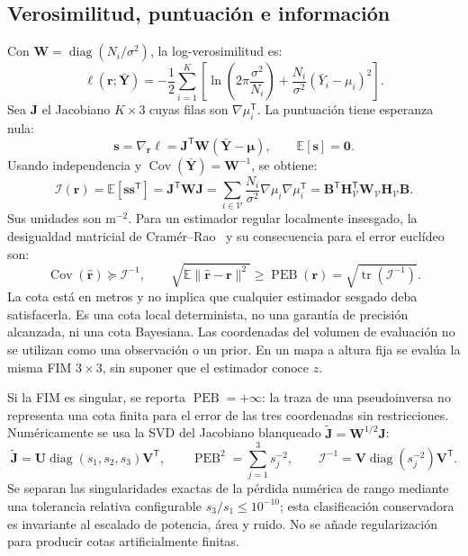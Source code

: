 \documentclass[11pt,a4paper]{article}
\newcommand{\PEB}{\operatorname{PEB}}
\newcommand{\tr}{\operatorname{tr}}
\begin{document}
\subsection{Verosimilitud, puntuación e información}
Con $\mathbf W=\operatorname{diag}(N_i/\sigma^2)$, la log-verosimilitud es:
\begin{equation}
\ell(\mathbf r;\bar{\mathbf Y})=-\frac12\sum_{i=1}^K
\left[\ln\left(2\pi\frac{\sigma^2}{N_i}\right)+\frac{N_i}{\sigma^2}(\bar Y_i-\mu_i)^2\right].
\label{eq:likelihood}
\end{equation}
Sea $\mathbf J$ el Jacobiano $K\times3$ cuyas filas son $\nabla\mu_i^{\mathsf T}$. La puntuación tiene esperanza nula:
\begin{equation}
\mathbf s=\nabla_{\mathbf r}\ell=\mathbf J^{\mathsf T}\mathbf W(\bar{\mathbf Y}-\bm\mu),\qquad
\mathbb E[\mathbf s]=\mathbf0.
\label{eq:score}
\end{equation}
Usando independencia y $\operatorname{Cov}(\bar{\mathbf Y})=\mathbf W^{-1}$, se obtiene:
\begin{equation}
\boxed{\mathcal I(\mathbf r)=\mathbb E[\mathbf s\mathbf s^{\mathsf T}]
=\mathbf J^{\mathsf T}\mathbf W\mathbf J
=\sum_{i\in\mathcal V}\frac{N_i}{\sigma^2}\nabla\mu_i\nabla\mu_i^{\mathsf T}
=\mathbf B^{\mathsf T}\mathbf H_{\mathcal V}^{\mathsf T}\mathbf W_{\mathcal V}\mathbf H_{\mathcal V}\mathbf B.}
\label{eq:FIM}
\end{equation}
Sus unidades son $\mathrm m^{-2}$. Para un estimador regular localmente insesgado, la desigualdad matricial de Cramér--Rao~\cite{kay} y su consecuencia para el error euclídeo son:
\begin{equation}
\operatorname{Cov}(\hat{\mathbf r})\succeq\mathcal I^{-1},\qquad
\sqrt{\mathbb E\|\hat{\mathbf r}-\mathbf r\|^2}\geq
\boxed{\PEB(\mathbf r)=\sqrt{\tr(\mathcal I^{-1})}}.
\label{eq:PEB}
\end{equation}
La cota está en metros y no implica que cualquier estimador sesgado deba satisfacerla. Es una cota local determinista, no una garantía de precisión alcanzada, ni una cota Bayesiana. Las coordenadas del volumen de evaluación no se utilizan como una observación o un prior. En un mapa a altura fija se evalúa la misma FIM $3\times3$, sin suponer que el estimador conoce $z$.

Si la FIM es singular, se reporta $\PEB=+\infty$: la traza de una pseudoinversa no representa una cota finita para el error de las tres coordenadas sin restricciones. Numéricamente se usa la SVD del Jacobiano blanqueado $\widetilde{\mathbf J}=\mathbf W^{1/2}\mathbf J$:
\begin{equation}
\widetilde{\mathbf J}=\mathbf U\operatorname{diag}(s_1,s_2,s_3)\mathbf V^{\mathsf T},\qquad
\PEB^2=\sum_{j=1}^3 s_j^{-2},\qquad
\mathcal I^{-1}=\mathbf V\operatorname{diag}(s_j^{-2})\mathbf V^{\mathsf T}.
\label{eq:svd}
\end{equation}
Se separan las singularidades exactas de la pérdida numérica de rango mediante una tolerancia relativa configurable $s_3/s_1\leq10^{-10}$; esta clasificación conservadora es invariante al escalado de potencia, área y ruido. No se añade regularización para producir cotas artificialmente finitas.
\end{document}
